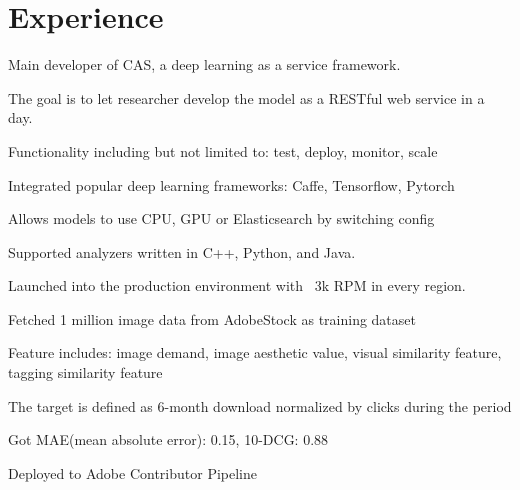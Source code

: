 \documentclass[letterpaper]{deedy-resume} %
\begin{document}
\hfill
%
%
\begin{minipage}[t]{0.66\textwidth} %


\section{Experience}


\sectionspace

\vspace{\topsep} %
\begin{tightitemize}
\item Main developer of CAS, a deep learning as a service framework. 
\item The goal is to let researcher develop the model as a RESTful web service in a day.
\item Functionality including but not limited to: test, deploy, monitor, scale
\item Integrated popular deep learning frameworks: Caffe, Tensorflow, Pytorch
\item Allows models to use CPU, GPU or Elasticsearch by switching config
\item Supported analyzers written in C++, Python, and Java. 
\item Launched into the production environment with ~3k RPM in every region.
\end{tightitemize}

\sectionspace

\begin{tightitemize}
\item Fetched 1 million image data from AdobeStock as training dataset
\item Feature includes: image demand, image aesthetic value, visual similarity feature, tagging similarity feature
\item The target is defined as 6-month download normalized by clicks during the period
\item Got MAE(mean absolute error): 0.15, 10-DCG: 0.88
\item Deployed to Adobe Contributor Pipeline
\end{tightitemize}


\end{minipage}
\end{document}
